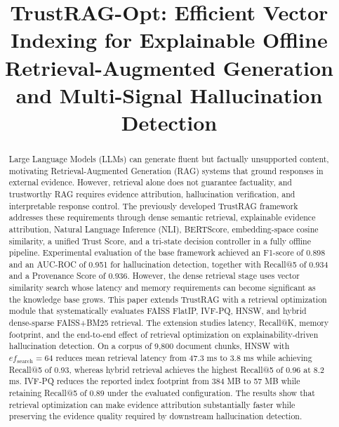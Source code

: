 \documentclass[conference]{IEEEtran}
\begin{document}
\title{TrustRAG-Opt: Efficient Vector Indexing for Explainable Offline Retrieval-Augmented Generation and Multi-Signal Hallucination Detection}

\author{
}

\maketitle

\begin{abstract}
Large Language Models (LLMs) can generate fluent but factually unsupported content, motivating Retrieval-Augmented Generation (RAG) systems that ground responses in external evidence. However, retrieval alone does not guarantee factuality, and trustworthy RAG requires evidence attribution, hallucination verification, and interpretable response control. The previously developed TrustRAG framework addresses these requirements through dense semantic retrieval, explainable evidence attribution, Natural Language Inference (NLI), BERTScore, embedding-space cosine similarity, a unified Trust Score, and a tri-state decision controller in a fully offline pipeline. Experimental evaluation of the base framework achieved an F1-score of 0.898 and an AUC-ROC of 0.951 for hallucination detection, together with Recall@5 of 0.934 and a Provenance Score of 0.936. However, the dense retrieval stage uses vector similarity search whose latency and memory requirements can become significant as the knowledge base grows. This paper extends TrustRAG with a retrieval optimization module that systematically evaluates FAISS FlatIP, IVF-PQ, HNSW, and hybrid dense-sparse FAISS+BM25 retrieval. The extension studies latency, Recall@K, memory footprint, and the end-to-end effect of retrieval optimization on explainability-driven hallucination detection. On a corpus of 9,800 document chunks, HNSW with $ef_{\mathrm{search}}=64$ reduces mean retrieval latency from 47.3 ms to 3.8 ms while achieving Recall@5 of 0.93, whereas hybrid retrieval achieves the highest Recall@5 of 0.96 at 8.2 ms. IVF-PQ reduces the reported index footprint from 384 MB to 57 MB while retaining Recall@5 of 0.89 under the evaluated configuration. The results show that retrieval optimization can make evidence attribution substantially faster while preserving the evidence quality required by downstream hallucination detection.
\end{abstract}
\end{document}
